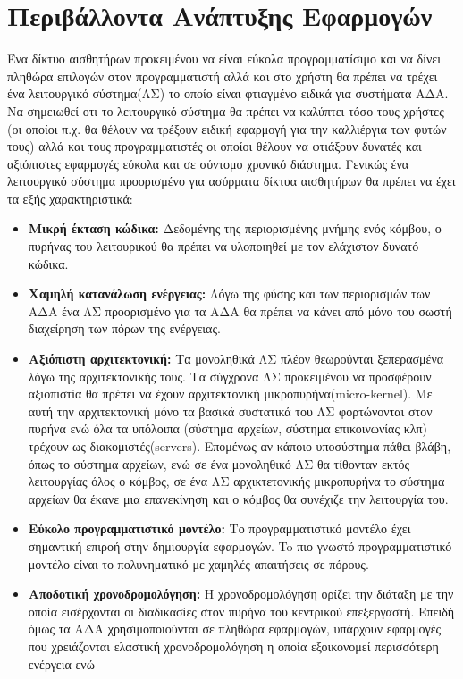 \section{Περιβάλλοντα Ανάπτυξης Εφαρμογών}
Ένα δίκτυο αισθητήρων προκειμένου να είναι εύκολα προγραμματίσιμο και να δίνει πληθώρα επιλογών στον προγραμματιστή αλλά και στο χρήστη θα πρέπει να τρέχει ένα
λειτουργικό σύστημα(ΛΣ) το οποίο είναι φτιαγμένο ειδικά για συστήματα ΑΔΑ.
Να σημειωθεί οτι το λειτουργικό σύστημα θα πρέπει να καλύπτει τόσο τους χρήστες (οι οποίοι π.χ. θα θέλουν να τρέξουν ειδική εφαρμογή για την καλλιέργια των φυτών
τους) αλλά και τους προγραμματιστές οι οποίοι θέλουν να φτιάξουν δυνατές και αξιόπιστες εφαρμογές εύκολα και σε σύντομο χρονικό διάστημα.
Γενικώς ένα λειτουργικό σύστημα προορισμένο για ασύρματα δίκτυα αισθητήρων θα πρέπει να έχει τα εξής χαρακτηριστικά:
\begin{itemize}
\item \textbf{Μικρή έκταση κώδικα:} Δεδομένης της περιορισμένης μνήμης ενός κόμβου, ο πυρήνας του λειτουρικού θα πρέπει να υλοποιηθεί με τον ελάχιστον δυνατό
κώδικα.
\item \textbf{Χαμηλή κατανάλωση ενέργειας:} Λόγω της φύσης και των περιορισμών των ΑΔΑ ένα ΛΣ προορισμένο για τα ΑΔΑ θα πρέπει να κάνει από μόνο του σωστή
διαχείρηση των πόρων της ενέργειας.
\item \textbf{Αξιόπιστη αρχιτεκτονική:} Τα μονοληθικά ΛΣ πλέον θεωρούνται ξεπερασμένα λόγω της αρχιτεκτονικής τους. Τα σύγχρονα ΛΣ προκειμένου να προσφέρουν
αξιοπιστία θα πρέπει να έχουν αρχιτεκτονική μικροπυρήνα(micro-kernel).
Με αυτή την αρχιτεκτονική μόνο τα βασικά συστατικά του ΛΣ φορτώνονται στον πυρήνα ενώ όλα τα υπόλοιπα (σύστημα αρχείων, σύστημα επικοινωνίας κλπ) τρέχουν ως
διακομιστές(servers).
Επομένως αν κάποιο υποσύστημα πάθει βλάβη, όπως το σύστημα αρχείων, ενώ σε ένα μονοληθικό ΛΣ θα τίθονταν εκτός λειτουργίας όλος ο κόμβος, σε ένα ΛΣ αρχικτετονικής
μικροπυρήνα το σύστημα αρχείων θα έκανε μια επανεκίνηση και ο κόμβος θα συνέχιζε την λειτουργία του.
\item \textbf{Εύκολο προγραμματιστικό μοντέλο:} Το προγραμματιστικό μοντέλο έχει σημαντική επιροή στην δημιουργία εφαρμογών.
To πιο γνωστό προγραμματιστικό μοντέλο είναι το πολυνηματικό με χαμηλές απαιτήσεις σε πόρους.\cite{os_sensors}
\item \textbf{Αποδοτική χρονοδρομολόγηση:} Η χρονοδρομολόγηση ορίζει την διάταξη με την οποία εισέρχονται οι διαδικασίες στον πυρήνα του κεντρικού επεξεργαστή.
Επειδή όμως τα ΑΔΑ χρησιμοποιούνται σε πληθώρα εφαρμογών, υπάρχουν εφαρμογές που χρειάζονται ελαστική χρονοδρομολόγηση η οποία εξοικονομεί περισσότερη ενέργεια ενώ

\end{itemize}
